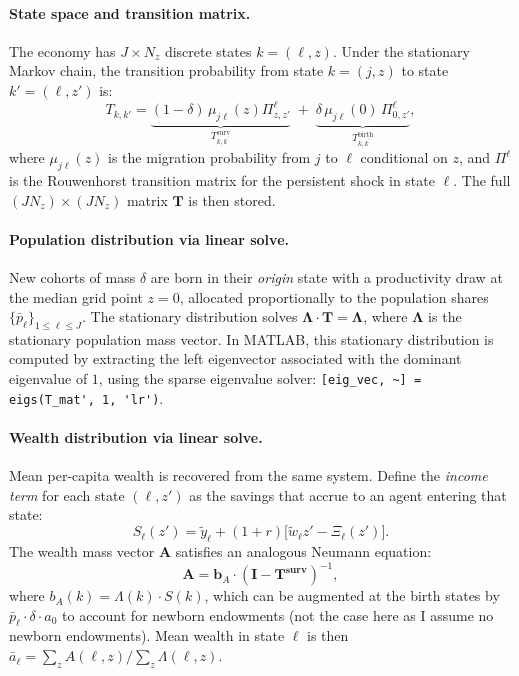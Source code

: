 \documentclass[12pt, a4paper]{article}
\begin{document}
\paragraph{State space and transition matrix.}
The economy has $J \times N_z$ discrete states $k = (\ell, z)$. Under the stationary Markov chain, the transition probability from state $k = (j, z)$ to state $k' = (\ell, z')$ is:
\begin{equation}
  T_{k,k'} = \underbrace{ (1 - \delta) \,\mu_{j\ell}(z) \Pi^\ell_{z, z'}}_{T_{k,k^\prime}^{\text{surv}}}  \;+\;\underbrace{\delta\,\mu_{j\ell}(0)\,\Pi^\ell_{0,z'}}_{T_{k,k^\prime}^{\text{birth}}} ,
\end{equation}
where $\mu_{j\ell}(z)$ is the migration probability from $j$ to $\ell$ conditional on $z$, and $\Pi^\ell$ is the Rouwenhorst transition matrix for the persistent shock in state $\ell$. The full $(J N_z) \times (J N_z)$ matrix $\mathbf{T}$ is then stored.

\paragraph{Population distribution via linear solve.}
New cohorts of mass $\delta$ are born in their \textit{origin} state with a productivity draw at the median grid point $z = 0$, allocated proportionally to the population shares $\{\bar p_\ell\}_{1\le \ell \le J}$. The stationary distribution solves $\boldsymbol{\Lambda} \cdot \mathbf{T} = \boldsymbol{\Lambda}$, where $\boldsymbol{\Lambda}$ is the stationary population mass vector. In MATLAB, this stationary distribution is computed by extracting the left eigenvector associated with the dominant eigenvalue of $1$, using the sparse eigenvalue solver: \verb|[eig_vec, ~] = eigs(T_mat', 1, 'lr')|.

\paragraph{Wealth distribution via linear solve.}
Mean per-capita wealth is recovered from the same system. Define the \textit{income term} for each state $(\ell, z')$ as the savings that accrue to an agent entering that state:
\begin{equation}
  S_\ell(z') = \tilde y_\ell + (1+r)\bigl[\tilde w_\ell z' - \Xi_\ell(z')\bigr].
\end{equation}
The wealth mass vector $\mathbf{A}$ satisfies an analogous Neumann equation:
\begin{equation}
  \mathbf{A} = \boldsymbol{b}_A \cdot (\mathbf{I} - \mathbf{T^{\text{surv}}})^{-1},
  \label{eq:A_inv}
\end{equation}
where $b_A(k) = \Lambda(k) \cdot S(k)$, which can be augmented at the birth states by $\bar p_\ell \cdot \delta \cdot a_0$ to account for newborn endowments (not the case here as I assume no newborn endowments). Mean wealth in state $\ell$ is then $\bar a_\ell = \sum_{z} A(\ell, z) / \sum_{z} \Lambda(\ell, z)$.
\end{document}
